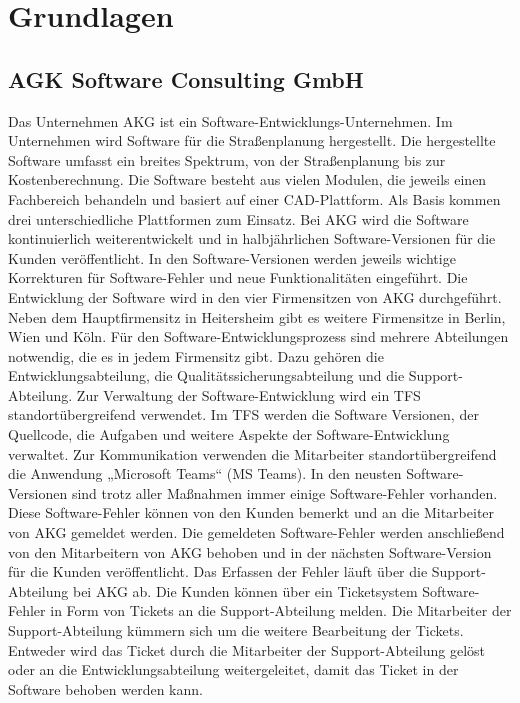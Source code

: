 \section{Grundlagen}

\subsection{AGK Software Consulting GmbH}
Das Unternehmen AKG ist ein Software-Entwicklungs-Unternehmen. Im Unternehmen wird Software für die Straßenplanung hergestellt. Die hergestellte Software umfasst ein breites Spektrum, von der Straßenplanung bis zur Kostenberechnung. Die Software besteht aus vielen Modulen, die jeweils einen Fachbereich behandeln und basiert auf
einer CAD-Plattform. Als Basis kommen drei unterschiedliche Plattformen zum Einsatz. Bei AKG wird die Software kontinuierlich weiterentwickelt und in halbjährlichen
Software-Versionen für die Kunden veröffentlicht. In den Software-Versionen werden jeweils wichtige Korrekturen für Software-Fehler und neue Funktionalitäten eingeführt. Die Entwicklung der Software wird in den vier Firmensitzen von AKG durchgeführt. Neben dem Hauptfirmensitz in Heitersheim gibt es weitere Firmensitze in Berlin, Wien und Köln. Für den Software-Entwicklungsprozess sind mehrere Abteilungen notwendig, die es in jedem Firmensitz gibt. Dazu gehören die Entwicklungsabteilung, die Qualitätssicherungsabteilung und die Support-Abteilung. Zur Verwaltung der Software-Entwicklung wird ein \ac{TFS} standortübergreifend verwendet. Im \ac{TFS} werden die Software Versionen, der Quellcode, die Aufgaben und weitere Aspekte der Software-Entwicklung verwaltet. Zur Kommunikation verwenden die Mitarbeiter standortübergreifend die Anwendung „Microsoft Teams“ (MS Teams). In den neusten Software-Versionen sind trotz aller Maßnahmen immer einige Software-Fehler vorhanden. Diese Software-Fehler können von den Kunden bemerkt und an die Mitarbeiter von AKG gemeldet werden. Die gemeldeten Software-Fehler werden anschließend von den Mitarbeitern von AKG behoben und in der nächsten Software-Version für die Kunden veröffentlicht. Das Erfassen der Fehler läuft über die Support-Abteilung bei AKG ab. Die Kunden können über ein Ticketsystem Software-Fehler in Form von Tickets an die Support-Abteilung melden. Die Mitarbeiter der Support-Abteilung kümmern sich um die weitere Bearbeitung der Tickets. Entweder wird das Ticket durch die Mitarbeiter der Support-Abteilung gelöst oder an die Entwicklungsabteilung weitergeleitet, damit das Ticket in der Software behoben werden kann.

